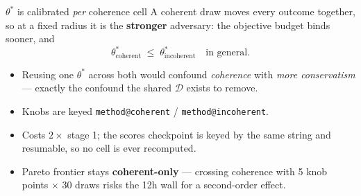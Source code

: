 \documentclass{beamer}
\begin{document}
\begin{frame}{$\theta^\ast$ is calibrated \emph{per} coherence cell}
  \small
  A coherent draw moves every outcome together, so at a fixed radius it is the
  \textbf{stronger} adversary: the objective budget binds sooner, and
  \[
    \theta^\ast_{\text{coherent}} \;\le\; \theta^\ast_{\text{incoherent}}
    \quad\text{in general.}
  \]
  \begin{itemize}
    \item Reusing one $\theta^\ast$ across both would confound \emph{coherence}
      with \emph{more conservatism} --- exactly the confound the shared
      $\mathcal D$ exists to remove.
    \item Knobs are keyed \texttt{method@coherent} / \texttt{method@incoherent}.
    \item Costs $2\times$ stage 1; the scores checkpoint is keyed by the same
      string and resumable, so no cell is ever recomputed.
    \item Pareto frontier stays \textbf{coherent-only} --- crossing coherence with
      5 knob points $\times$ 30 draws risks the 12h wall for a second-order effect.
  \end{itemize}
\end{frame}
\end{document}
